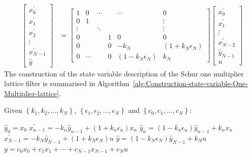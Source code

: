 \documentclass[a4paper,twoside,10pt,english]{article}
\begin{document}
\begin{align*}
\left[\begin{array}{c}
x_{0}^{\prime}\\
x_{1}^{\prime}\\
x_{2}^{\prime}\\
\vdots\\
x_{N-1}^{\prime}\\
\hat{y}
\end{array}\right] & = \left[\begin{array}{cccccc}
1 & 0 & \cdots &  & \cdots & 0\\
0 & 1 &  &  &  & \vdots\\
\vdots &  & \ddots & & & \vdots\\
0 &  &  & 1 & 0 & 0\\
0 &  &  &  0 & -k_{N} & \left(1+k_{N}\epsilon_{N}\right)\\
0 & \cdots &  & 0 & \left(1-k_{N}\epsilon_{N}\right) & k_{N}
\end{array}\right]\left[\begin{array}{c}
x_{0}^{\prime}\\
x_{1}^{\prime}\\
\vdots\\
x_{N-2}^{\prime}\\
\hat{y}_{N-1}\\
u
\end{array}\right]
\end{align*}
The construction of the state variable description of the Schur one multiplier
lattice filter is summarised in
Algorithm~\ref{alg:Construction-state-variable-One-Multiplier-lattice}.

\begin{algorithm}[!hbp]
Given $\left\{k_{1},k_{2},\hdots,k_{N}\right\}$,
$\left\{\epsilon_{1},\epsilon_{2},\hdots,\epsilon_{N}\right\}$ and
$\left\{c_{0},c_{1},\hdots,c_{N}\right\}$:
\begin{algorithmic}
\State $\hat{y}_{0} = x_{0}$
  \State $x_{n-1}^{\prime}=-k_{n}\hat{y}_{n-1}+\left(1+k_{n}\epsilon_{n}\right)x_{n}$
  \State $\hat{y}_{n}= \left(1-k_{n}\epsilon_{n}\right)\hat{y}_{n-1}+k_{n}x_{n}$
\EndFor
\State $x_{N-1}^{\prime} = -k_{N}\hat{y}_{N-1}+\left(1+k_{N}\epsilon_{N}\right)u$
\State $\hat{y} = \left(1-k_{N}\epsilon_{N}\right)\hat{y}_{N-1}+k_{N}u$
\State $y  = c_{0}x_{0}+c_{1}x_{1}+\cdots+c_{N-1}x_{N-1}+c_{N}u$
\end{algorithmic}
\caption{Construction of a state variable description of the Schur
  one multiplier lattice filter.}
\label{alg:Construction-state-variable-One-Multiplier-lattice}
\end{algorithm}
\end{document}
